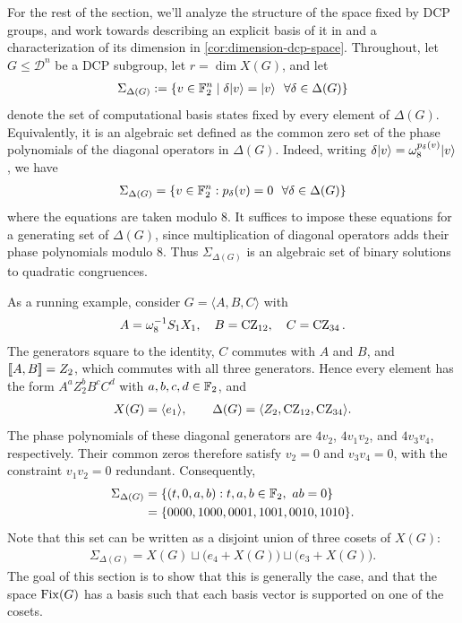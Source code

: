 For the rest of the section, we'll analyze the structure of the space fixed by DCP groups, and work towards describing an explicit basis of it in  and a characterization of its dimension in \cref{cor:dimension-dcp-space}. Throughout, let $G \le \mathcal{D}^n$ be a DCP subgroup, let $r = \dim X(G)$, and let
\begin{align}
    \Sigma_{\Delta(G)} := \{ v \in \mathbb{F}_2^n \mid \delta|v\rangle = |v\rangle \ \ \forall \delta \in \Delta(G) \}
\end{align}
denote the set of computational basis states fixed by every element of $\Delta(G)$. Equivalently, it is an algebraic set defined as the common zero set of the phase polynomials of the diagonal operators in $\Delta(G)$.
Indeed, writing $\delta|v\rangle=\omega_8^{p_\delta(v)}|v\rangle$, we have
\begin{align}
    \Sigma_{\Delta(G)}
    =\{v\in\mathbb{F}_2^n:p_\delta(v)=0 \ \ \forall \delta\in\Delta(G)\}
\end{align}
where the equations are taken modulo $8$.
It suffices to impose these equations for a generating set of $\Delta(G)$, since multiplication of diagonal operators adds their phase polynomials modulo $8$.
Thus $\Sigma_{\Delta(G)}$ is an algebraic set of binary solutions to quadratic congruences.

\begin{example}\label{ex:dcp-atomic-basis}
    As a running example, consider $G=\langle A,B,C\rangle$ with
    \begin{align}
        A=\omega_8^{-1}S_1X_1,
        \quad B=\operatorname{CZ}_{12},
        \quad C=\operatorname{CZ}_{34}.
    \end{align}
    The generators square to the identity, $C$ commutes with $A$ and $B$, and $\mathopen{[\![}A,B\mathclose{]\!]}=Z_2$, which commutes with all three generators.
    Hence every element has the form $A^aZ_2^bB^cC^d$ with $a,b,c,d\in\mathbb{F}_2$, and
    \begin{align}
        X(G)=\langle e_1\rangle,
        \qquad
        \Delta(G)=\langle Z_2,\operatorname{CZ}_{12},\operatorname{CZ}_{34}\rangle.
    \end{align}
    The phase polynomials of these diagonal generators are $4v_2$, $4v_1v_2$, and $4v_3v_4$, respectively.
    Their common zeros therefore satisfy $v_2=0$ and $v_3v_4=0$, with the constraint $v_1v_2=0$ redundant.
    Consequently,
    \begin{align}
        \Sigma_{\Delta(G)}
        &=\{(t,0,a,b):t,a,b\in\mathbb{F}_2,\ ab=0\}\\
        &=\{0000,1000,0001,1001,0010,1010\}.
    \end{align}
    Note that this set can be written as a disjoint union of three cosets of $X(G)$:
    \begin{align}
        \Sigma_{\Delta(G)}
        =X(G)\sqcup\big(e_4+X(G)\big)\sqcup\big(e_3+X(G)\big).
    \end{align}
    The goal of this section is to show that this is generally the case, and that the space $\operatorname{Fix}(G)$ has a basis such that each basis vector is supported on one of the cosets.
\end{example}

